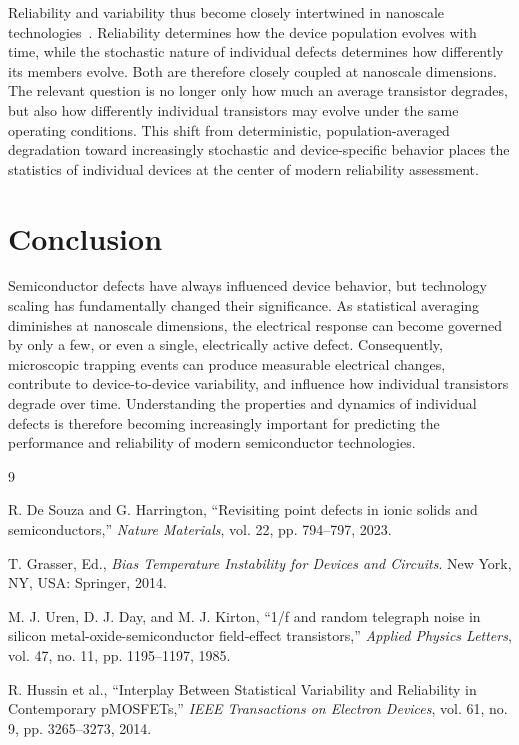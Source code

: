 \documentclass[10pt,a4paper]{article}
\begin{document}
	Reliability and variability thus become closely intertwined in nanoscale technologies~\cite{Hussin2014}. Reliability determines how the device population evolves with time, while the stochastic nature of individual defects determines how differently its members evolve. Both are therefore closely coupled at nanoscale dimensions. The relevant question is no longer only how much an average transistor degrades, but also how differently individual transistors may evolve under the same operating conditions. This shift from deterministic, population-averaged degradation toward increasingly stochastic and device-specific behavior places the statistics of individual devices at the center of modern reliability assessment.
	
	\section{Conclusion}
	
	Semiconductor defects have always influenced device behavior, but technology scaling has fundamentally changed their significance. As statistical averaging diminishes at nanoscale dimensions, the electrical response can become governed by only a few, or even a single, electrically active defect. Consequently, microscopic trapping events can produce measurable electrical changes, contribute to device-to-device variability, and influence how individual transistors degrade over time. Understanding the properties and dynamics of individual defects is therefore becoming increasingly important for predicting the performance and reliability of modern semiconductor technologies.
	
	
	\begin{thebibliography}{9}
		
		R. De Souza and G. Harrington,
		``Revisiting point defects in ionic solids and semiconductors,''
		\textit{Nature Materials},
		vol. 22,
		pp. 794--797,
		2023.
		
		T. Grasser, Ed.,
		\textit{Bias Temperature Instability for Devices and Circuits}.
		New York, NY, USA:
		Springer,
		2014.
		
		M. J. Uren, D. J. Day, and M. J. Kirton,
		``1/f and random telegraph noise in silicon metal-oxide-semiconductor field-effect transistors,''
		\textit{Applied Physics Letters},
		vol. 47,
		no. 11,
		pp. 1195--1197,
		1985.
		
		R. Hussin et al.,
		``Interplay Between Statistical Variability and Reliability in Contemporary pMOSFETs,''
		\textit{IEEE Transactions on Electron Devices},
		vol. 61,
		no. 9,
		pp. 3265--3273,
		2014.
		
	\end{thebibliography}
	
\end{document}
